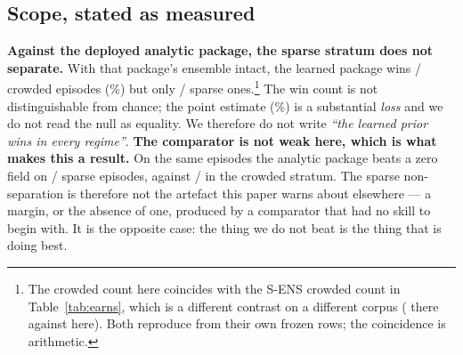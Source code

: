 \documentclass[review]{elsarticle}
\begin{document}
\subsection{Scope, stated as measured}
\label{sec:res_scope}

\textbf{Against the deployed analytic package, the sparse stratum does not
separate.} With that package's ensemble intact, the learned package wins
\WFifteenCrowdedBetter{}/\WFifteenCrowdedN{} crowded episodes
(\WFifteenCrowdedRel{}\%) but only \WFifteenSparseBetter{}/\WFifteenSparseN{} sparse
ones.\footnote{The crowded count here coincides with the S-ENS crowded count in
Table~\ref{tab:earns}, which is a different contrast on a different corpus
(\SEnsRel{} there against \WFifteenCrowdedRel{} here). Both reproduce from their own
frozen rows; the coincidence is arithmetic.} The win count is not distinguishable from chance; the point estimate
(\WFifteenSparseRel{}\%) is a substantial \emph{loss} and we do not read the null as
equality. We therefore do not write \emph{``the learned prior wins in every
regime''}.
\textbf{The comparator is not weak here, which is what makes this a result.} On the
same episodes the analytic package beats a zero field on
\WFifteenSparseCmpZero{}/\WFifteenSparseN{} sparse episodes, against
\WFifteenCrowdedCmpZero{}/\WFifteenCrowdedN{} in the crowded stratum. The sparse
non-separation is therefore not the artefact this paper warns about elsewhere --- a
margin, or the absence of one, produced by a comparator that had no skill to begin
with. It is the opposite case: the thing we do not beat is the thing that is doing
best.
\end{document}
